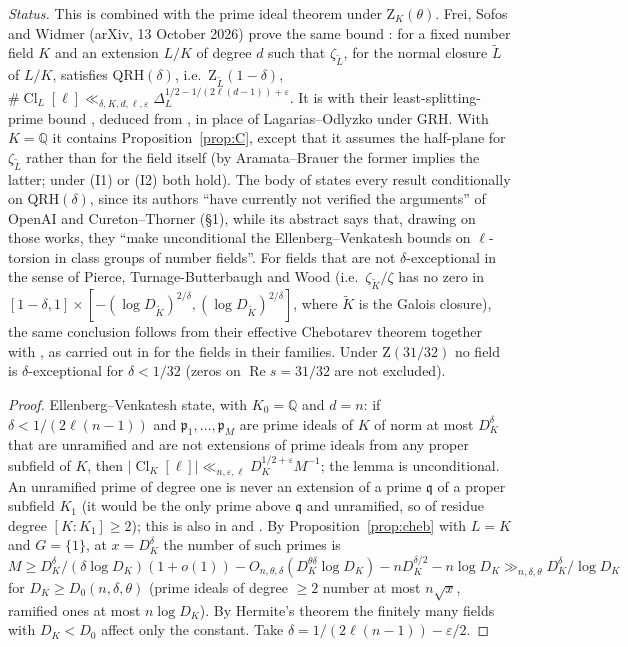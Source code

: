 \documentclass[11pt]{amsart}
\theoremstyle{definition}
\theoremstyle{remark}
\newcommand{\Q}{\mathbb{Q}}
\newcommand{\fp}{\mathfrak{p}}
\DeclareMathOperator{\Cl}{Cl}
\newcommand{\Zt}{\mathrm{Z}}       %
\begin{document}
\emph{Status.} This is \cite[Lemma~3]{EV} combined with the prime ideal theorem under $\Zt_K(\theta)$. Frei, Sofos
and Widmer (arXiv, 13 October 2026) prove the same bound \cite[Cor.~1.4]{FSW}: for a fixed number field $K$ and an
extension $L/K$ of degree $d$ such that $\zeta_{\widetilde L}$, for the normal closure $\widetilde L$ of $L/K$, satisfies
QRH$(\delta)$, i.e.\ $\Zt_{\widetilde L}(1-\delta)$, $\#\Cl_L[\ell]\ll_{\delta,K,d,\ell,\varepsilon}\Delta_L^{1/2-1/(2\ell(d-1))+\varepsilon}$. It is
\cite[Prop.~3.1]{EV} with their least-splitting-prime bound \cite[Cor.~1.2]{FSW}, deduced from \cite[Thm.~1.1]{FSW}, in
place of Lagarias--Odlyzko under GRH. With $K=\Q$ it contains Proposition~\ref{prop:C}, except that it assumes the
half-plane for $\zeta_{\widetilde L}$ rather than for the field itself (by Aramata--Brauer the former implies the
latter; under (I1) or (I2) both hold). The body of \cite{FSW} states every result conditionally on QRH$(\delta)$, since
its authors ``have currently not verified the arguments'' of OpenAI and Cureton--Thorner (\S1), while its abstract
says that, drawing on those works, they ``make unconditional the Ellenberg--Venkatesh bounds on $\ell$-torsion in
class groups of number fields''. For fields
that are not $\delta$-exceptional in the sense of Pierce, Turnage-Butterbaugh and Wood \cite[Property~1.2]{PTW}
(i.e.\ $\zeta_{\widetilde K}/\zeta$ has no zero in $[1-\delta,1]\times[-(\log D_{\widetilde K})^{2/\delta},(\log
D_{\widetilde K})^{2/\delta}]$, where $\widetilde K$ is the Galois closure), the same conclusion follows from their
effective Chebotarev theorem \cite[Thm.~1.3]{PTW} together with \cite[Lemma~3]{EV}, as carried out in \cite[\S7.2]{PTW}
for the fields in their families. Under $\Zt(31/32)$ no field is $\delta$-exceptional for $\delta<1/32$ (zeros on
$\operatorname{Re}s=31/32$ are not excluded).

\begin{proof}
Ellenberg--Venkatesh \cite[Lemma~3]{EV} state, with $K_0=\Q$ and $d=n$: if $\delta<1/(2\ell(n-1))$ and
$\fp_1,\dots,\fp_M$ are prime ideals of $K$ of norm at most $D_K^\delta$ that are unramified and are not extensions of
prime ideals from any proper subfield of $K$, then $|\Cl_K[\ell]|\ll_{n,\varepsilon,\ell}D_K^{1/2+\varepsilon}M^{-1}$;
the lemma is unconditional. An unramified prime of degree one is never an extension of a prime $\mathfrak q$ of a proper
subfield $K_1$ (it would be the only prime above $\mathfrak q$ and unramified, so of residue degree $[K:K_1]\ge2$);
this is also in \cite[Lemma~2]{HB} and \cite[\S10.1]{LOTZ}. By Proposition~\ref{prop:cheb} with $L=K$ and
$G=\{1\}$, at $x=D_K^\delta$ the number of such primes is
$M\ge D_K^\delta/(\delta\log D_K)(1+o(1))-O_{n,\theta,\delta}(D_K^{\theta\delta}\log D_K)-nD_K^{\delta/2}-n\log D_K
\gg_{n,\delta,\theta}D_K^\delta/\log D_K$ for $D_K\ge D_0(n,\delta,\theta)$ (prime ideals of degree $\ge2$ number at
most $n\sqrt x$, ramified ones at most $n\log D_K$). By Hermite's theorem the finitely many fields with $D_K<D_0$
affect only the constant. Take $\delta=1/(2\ell(n-1))-\varepsilon/2$.
\end{proof}
\end{document}
